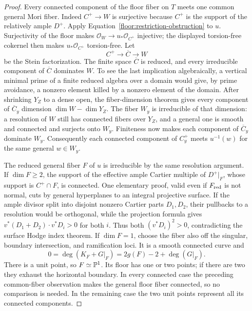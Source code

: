 \begin{proof}
Every connected component of the floor fiber on \(T\) meets one common
general Mori fiber.  Indeed \(C^+\to W\) is surjective because \(C^+\)
is the support of the relatively ample \(D^+\).  Apply
Equation~\eqref{floor:restriction-obstruction} to \(u\).  Surjectivity of
the floor makes \(\mathcal O_W\to u_*\mathcal O_{C^+}\) injective; the
displayed torsion-free cokernel then makes \(u_*\mathcal O_{C^+}\)
torsion-free.  Let
\[
 C^+\longrightarrow\overline C\longrightarrow W
\]
be the Stein factorization.  The finite space \(\overline C\) is reduced,
and every irreducible component of
\(\overline C\) dominates \(W\).  To see the
last implication algebraically, a vertical minimal prime of a finite
reduced algebra over a domain would give, by prime avoidance, a nonzero
element killed by a nonzero element of the domain.  After shrinking \(Y_Z\)
to a dense open, the fiber-dimension theorem gives every component of
\(\overline C_y\) dimension \(\dim W-\dim Y_Z\).  The fiber \(W_y\) is irreducible of that
dimension: a resolution of \(W\) still has connected fibers over \(Y_Z\),
and a general one is smooth and connected and surjects onto \(W_y\).
Finiteness now makes each component of \(\overline C_y\) dominate \(W_y\).
Consequently each connected component of \(C^+_y\) meets \(u^{-1}(w)\)
for the same general \(w\in W_y\).

The reduced general fiber \(F\) of \(u\) is irreducible by the same
resolution argument.  If \(\dim F\geq2\), the support of the effective
ample Cartier multiple of \(D^+|_F\), whose support is \(C^+\cap F\),
is connected.  One elementary
proof, valid even if \(F_{\rm red}\) is not normal, cuts by general
hyperplanes to an integral projective surface.  If the ample divisor
split into disjoint nonzero Cartier parts \(D_1,D_2\), their pullbacks
to a resolution would be orthogonal, while the projection formula gives
\(v^*(D_1+D_2)\cdot v^*D_i>0\) for both \(i\).  Thus both
\((v^*D_i)^2>0\), contradicting the surface Hodge index theorem.
If \(\dim F=1\), choose the fiber also off the singular, boundary
intersection, and ramification loci.  It is a smooth connected curve and
\[
 0=\deg(K_F+G|_F)=2g(F)-2+\deg(G|_F).
\]
There is a unit point, so \(F\simeq\mathbb P^1\).  Its floor has one or two
points; if there are two they exhaust the horizontal boundary.  In every
connected case the preceding common-fiber observation makes the general
floor fiber connected, so no comparison is needed.  In the remaining case
the two unit points represent all its connected components.


\end{proof}
